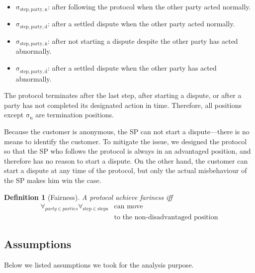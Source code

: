 \documentclass{ieeeaccess}
\newtheorem{definition}{Definition}
\begin{document}
\begin{itemize}

\item
  $\mathrm{\sigma_{step,party,n}}$: after following the protocol when the other party acted normally.
\item
  $\mathrm{\sigma_{step,party,d}}$: after a settled dispute when the other party acted normally.
\item
  $\mathrm{\sigma_{step,party,\overline{n}}}$: after not starting a dispute despite the other party has acted abnormally.
\item
  $\mathrm{\sigma_{step,party,\overline{d}}}$: after a settled dispute when the other party has acted abnormally.
\end{itemize}



The protocol terminates after the last step, after starting a dispute, or after a party has not completed its designated action in time. Therefore, all positions except $\mathrm{\sigma_n}$ are termination positions.

Because the customer is anonymous, the SP can not start a dispute—there is no means to identify the customer. To mitigate the issue, we designed the protocol so that the SP who follows the protocol is always in an advantaged position, and therefore has no reason to start a dispute. On the other hand, the customer can start a dispute at any time of the protocol, but only the actual misbehaviour of the SP makes him win the case.

\begin{definition}[Fairness] \label{def:fairness}
A protocol achieve fariness iff 
\begin{equation*}
\begin{split}
\forall_{party \in parties}\forall_{\mathrm{step} \in \mathrm{steps}} &\operatorname{can\ move}\\
&\operatorname{to\ the\ non-disadvantaged\ position} 
\end{split}
\end{equation*}

\end{definition}


\subsection{Assumptions}\label{assumptions}

Below we listed assumptions we took for the analysis purpose.  
\end{document}
